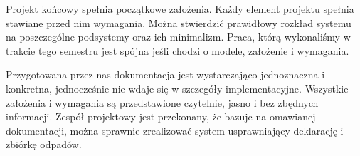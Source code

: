 Projekt końcowy spełnia początkowe założenia. Każdy element projektu spełnia stawiane przed nim wymagania. Można stwierdzić prawidłowy rozkład systemu na poszczególne podsystemy oraz ich minimalizm. Praca, którą wykonaliśmy w trakcie tego semestru jest spójna jeśli chodzi o modele, założenie i wymagania.

Przygotowana przez nas dokumentacja jest wystarczająco jednoznaczna i konkretna, jednocześnie nie wdaje się w szczegóły implementacyjne. Wszystkie założenia i wymagania są przedstawione czytelnie, jasno i bez zbędnych informacji. Zespół projektowy jest przekonany, że bazujc na omawianej dokumentacji, można sprawnie zrealizować system usprawniający deklarację i zbiórkę odpadów.